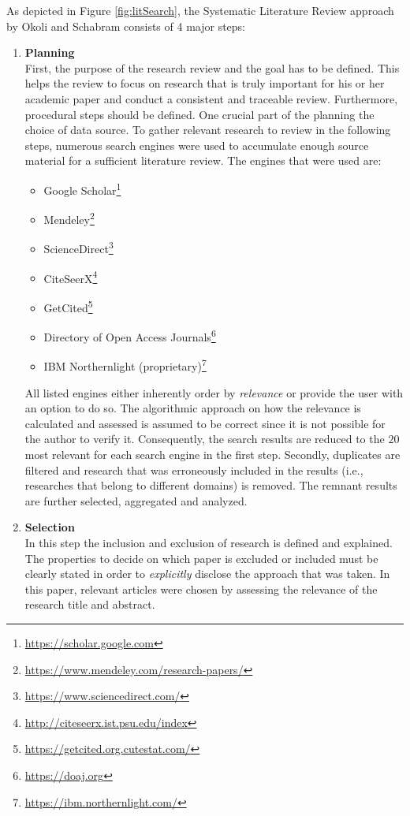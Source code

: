 As depicted in Figure \ref{fig:litSearch}, the Systematic Literature Review approach by Okoli and Schabram consists of 4 major steps: \\
\begin{enumerate}
    \item
    \textbf{Planning}\\
    First, the purpose of the research review and the goal has to be defined. This helps the review to focus on research that is truly important for his or her academic paper and conduct a consistent and traceable review. Furthermore, procedural steps should be defined. One crucial part of the planning the choice of data source. To gather relevant research to review in the following steps, numerous search engines were used to accumulate enough source material for a sufficient literature review. The engines that were used are: 
    \begin{itemize}
        \renewcommand\labelitemi{--}
        \item Google Scholar\footnote{\url{https://scholar.google.com}}
        \item Mendeley\footnote{\url{https://www.mendeley.com/research-papers/}}
        \item ScienceDirect\footnote{\url{https://www.sciencedirect.com/}}
        \item CiteSeerX\footnote{\url{http://citeseerx.ist.psu.edu/index}}
        \item GetCited\footnote{\url{https://getcited.org.cutestat.com/}}
        \item Directory of Open Access Journals\footnote{\url{https://doaj.org}}
        \item IBM Northernlight (proprietary)\footnote{\url{https://ibm.northernlight.com/}}
    \end{itemize}
    All listed engines either inherently order by \textit{relevance} or provide the user with an option to do so. The algorithmic approach on how the relevance is calculated and assessed is assumed to be correct since it is not possible for the author to verify it. Consequently, the search results are reduced to the $20$ most relevant for each search engine in the first step. Secondly, duplicates are filtered and research that was erroneously included in the results (i.e., researches that belong to different domains) is removed. The remnant results are further selected, aggregated and analyzed.
    \item
    \textbf{Selection}\\
    In this step the inclusion and exclusion of research is defined and explained. The properties to decide on which paper is excluded or included must be clearly stated in order to \textit{explicitly} disclose the approach that was taken. In this paper, relevant articles were chosen by assessing the relevance of the research title and abstract. 

\end{enumerate}
